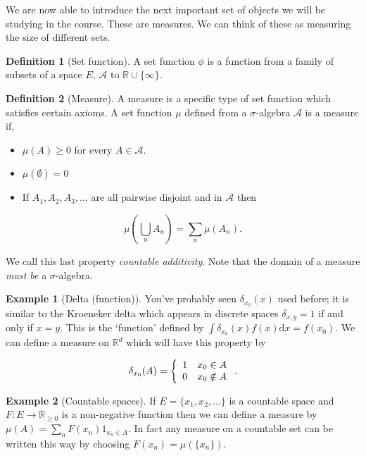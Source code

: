 \documentclass[
]{book}
\providecommand{\tightlist}{%
  \setlength{\itemsep}{0pt}\setlength{\parskip}{0pt}}
\theoremstyle{definition}
\newtheorem{definition}{Definition}[chapter]
\theoremstyle{definition}
\newtheorem{example}{Example}[chapter]
\theoremstyle{definition}
\theoremstyle{definition}
\theoremstyle{remark}
\begin{document}
We are now able to introduce the next important set of objects we will be studying in the course. These are measures. We can think of these as measuring the size of different sets.

\begin{definition}[Set function]
A set function \(\phi\) is a function from a family of subsets of a space \(E\), \(\mathcal{A}\) to \(\mathbb{R}\cup\{\infty\}\).
\end{definition}

\begin{definition}[Measure]
A measure is a specific type of set function which satisfies certain axioms. A set function \(\mu\) defined from a \(\sigma\)-algebra \(\mathcal{A}\) is a measure if,

\begin{itemize}
\tightlist
\item
  \(\mu(A) \geq 0\) for every \(A \in \mathcal{A}\).
\item
  \(\mu(\emptyset) = 0\)
\item
  If \(A_1, A_2, A_3, \dots\) are all pairwise disjoint and in \(\mathcal{A}\) then
\end{itemize}

\[\mu \left( \bigcup_n A_n \right) = \sum_n \mu(A_n).\]

We call this last property \emph{countable additivity}. Note that the domain of a measure \emph{must be} a \(\sigma\)-algebra.
\end{definition}

\begin{example}[Delta (function)]
You've probably seen \(\delta_{x_0}(x)\) used before; it is similar to the Kroeneker delta which appears in discrete spaces \(\delta_{x,y} = 1\) if and only if \(x=y\). This is the `function' defined by \(\int \delta_{x_0}(x)f(x) \mathrm{d}x = f(x_0)\). We can define a measure on \(\mathbb{R}^d\) which will have this property by

\[\delta_{x_0}(A) = \left\{ \begin{array}{l l} 1 & x_0 \in A \\ 0 & x_0 \notin A \end{array} \right..\]
\end{example}

\begin{example}[Countable spaces]
If \(E = \{ x_1, x_2, \dots\}\) is a countable space and \(F: E \rightarrow \mathbb{R}_{\geq 0}\) is a non-negative function then we can define a measure by \(\mu(A) = \sum_n F(x_n)1_{x_n \in A}\). In fact any measure on a countable set can be written this way by choosing \(F(x_n) = \mu(\{x_n\})\).
\end{example}
\end{document}
